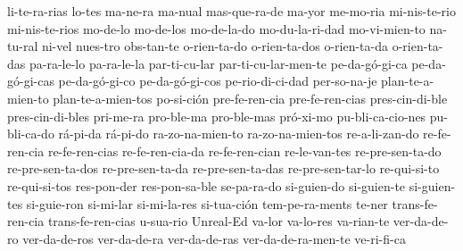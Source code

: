 {li-te-ra-rias
lo-tes
ma-ne-ra
ma-nual
mas-que-ra-de
ma-yor
me-mo-ria
mi-nis-te-rio
mi-nis-te-rios
mo-de-lo
mo-de-los
mo-de-la-do
mo-du-la-ri-dad
mo-vi-mien-to
na-tu-ral
ni-vel
nues-tro
obs-tan-te
o-rien-ta-do
o-rien-ta-dos
o-rien-ta-da
o-rien-ta-das
pa-ra-le-lo
pa-ra-le-la
par-ti-cu-lar
par-ti-cu-lar-men-te
pe-da-gó-gi-ca
pe-da-gó-gi-cas
pe-da-gó-gi-co
pe-da-gó-gi-cos
pe-rio-di-ci-dad
per-so-na-je
plan-te-a-mien-to
plan-te-a-mien-tos
po-si-ción
pre-fe-ren-cia
pre-fe-ren-cias
pres-cin-di-ble
pres-cin-di-bles
pri-me-ra
pro-ble-ma
pro-ble-mas
pró-xi-mo
pu-bli-ca-cio-nes
pu-bli-ca-do
rá-pi-da
rá-pi-do
ra-zo-na-mien-to
ra-zo-na-mien-tos
re-a-li-zan-do
re-fe-ren-cia
re-fe-ren-cias
re-fe-ren-cia-da
re-fe-ren-cian
re-le-van-tes
re-pre-sen-ta-do
re-pre-sen-ta-dos
re-pre-sen-ta-da
re-pre-sen-ta-das
re-pre-sen-tar-lo
re-qui-si-to
re-qui-si-tos
res-pon-der
res-pon-sa-ble
se-pa-ra-do
si-guien-do
si-guien-te
si-guien-tes
si-guie-ron
si-mi-lar
si-mi-la-res
si-tua-ción
tem-pe-ra-ments
te-ner
trans-fe-ren-cia
trans-fe-ren-cias
u-sua-rio
Unreal-Ed
va-lor
va-lo-res
va-rian-te
ver-da-de-ro
ver-da-de-ros
ver-da-de-ra
ver-da-de-ras
ver-da-de-ra-men-te
ve-ri-fi-ca
}
